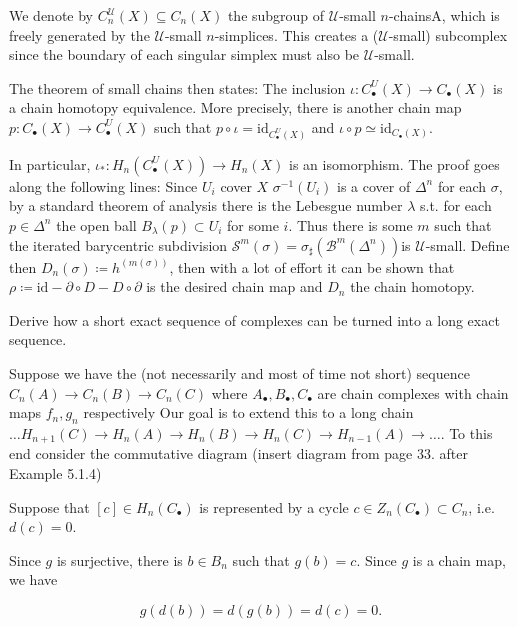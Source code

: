 We denote by \( C^{\mathcal{U}}_n(X) \subseteq C_n(X) \) the subgroup of \( \mathcal{U} \)-small \( n \)-chainsA, which is freely
generated by the \( \mathcal{U} \)-small \( n \)-simplices. This creates a (\( \mathcal{U} \)-small) subcomplex since the boundary
of each singular simplex must also be \( \mathcal{U} \)-small.

The theorem of small chains then states:
The inclusion \(\iota: C^{U}_\bullet(X) \to C_\bullet(X)\) is a chain homotopy equivalence. 
More precisely, there is another chain map \(p: C_\bullet(X) \to C^{U}_\bullet(X)\) such that \(p \circ \iota = \text{id}_{C^{U}_\bullet(X)}\) 
and \(\iota \circ p \simeq \text{id}_{C_\bullet(X)}\).

In particular, \(\iota_*: H_n(C^{U}_\bullet(X)) \to H_n(X)\) is an isomorphism.
The proof goes along the following lines:
Since \( U_i \) cover \( X \) \( \sigma^{-1}(U_i) \) is a cover of \( \Delta^n \) for each \( \sigma \),
by a standard theorem of analysis there is the Lebesgue number \( \lambda \) s.t. for each \( p \in \Delta^n \)
the open ball \( B_\lambda(p) \subset U_i \) for some \( i \). Thus there is some \( m \) such that
the iterated barycentric subdivision \( \mathcal{S}^m(\sigma) = \sigma_{\sharp}(\mathcal{B}^m(\Delta^n)) \)is \( \mathcal{U} \)-small.
Define then \( D_n(\sigma) \coloneqq h^{(m(\sigma))} \), then with a lot of effort it can be shown that \( \rho \coloneqq \text{id} - \partial \circ D - D \circ \partial \)
is the desired chain map and \( D_n \) the chain homotopy.



Derive how a short exact sequence of complexes can be turned into a long exact sequence.

Suppose we have the (not necessarily and most of time not short) sequence
\( C_n(A) \to C_n(B) \to C_n(C) \)
where \( A_\bullet, B_\bullet, C_\bullet \) are chain complexes
with chain maps \( f_n, g_n \) respectively
Our goal is to extend this to a long chain
\( \dots H_{n+1}(C) \to H_n(A) \to H_n(B) \to H_n(C) \to H_{n-1}(A) \to \dots \).
To this end consider the commutative diagram
(insert diagram from page 33. after Example 5.1.4)

Suppose that \([c] \in H_n(C_\bullet)\) is represented by a cycle \(c \in Z_n(C_\bullet) \subset C_n\), i.e. \(d(c) = 0\). 

Since \(g\) is surjective, there is \(b \in B_n\) such that \(g(b) = c\). Since \(g\) is a chain map, we have

\[g(d(b)) = d(g(b)) = d(c) = 0.\] 

